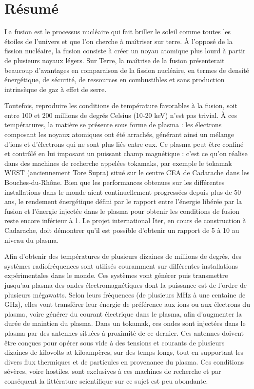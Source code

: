 \chapter*{Résumé}

La fusion est le processus nucléaire qui fait briller le soleil comme toutes les étoiles de l'univers et que l'on cherche à maîtriser sur terre. À l’opposé de la fission nucléaire, la fusion consiste à créer un noyau atomique plus lourd à partir de plusieurs noyaux légers. Sur Terre, la maîtrise de la fusion présenterait beaucoup d’avantages en comparaison de la fission nucléaire, en termes de densité énergétique, de sécurité, de ressources en combustibles et sans production intrinsèque de gaz à effet de serre. 

Toutefois, reproduire les conditions de température favorables à la fusion, soit entre 100 et 200 millions de degrés Celsius (10-20 keV) n’est pas trivial. À ces températures, la matière se présente sous forme de plasma : les électrons composant les noyaux atomiques ont été arrachés, générant ainsi un mélange d’ions et d’électrons qui ne sont plus liés entre eux. Ce plasma peut être confiné et contrôlé en lui imposant un puissant champ magnétique : c’est ce qu’on réalise dans des machines de recherche appelées tokamaks, par exemple le tokamak WEST (anciennement Tore Supra) situé sur le centre CEA de Cadarache dans les Bouches-du-Rhône. Bien que les performances obtenues sur les différentes installations dans le monde aient continuellement progressées depuis plus de 50 ans, le rendement énergétique défini par le rapport entre l'énergie libérée par la fusion et l'énergie injectée dans le plasma pour obtenir les conditions de fusion reste encore inférieur à 1. Le projet international Iter, en cours de construction à Cadarache, doit démontrer qu'il est possible d'obtenir un rapport de 5 à 10 au niveau du plasma.

Afin d'obtenir des températures de plusieurs dizaines de millions de degrés, des systèmes radiofréquences sont utilisés couramment sur différentes installations expérimentales dans le monde. Ces systèmes vont générer puis transmettre jusqu'au plasma des ondes électromagnétiques dont la puissance est de l'ordre de plusieurs mégawatts. Selon leurs fréquences (de plusieurs MHz à une centaine de GHz), elles vont transférer leur énergie de préférence aux ions ou aux électrons du plasma, voire générer du courant électrique dans le plasma, afin d'augmenter la durée de maintien du plasma. Dans un tokamak, ces ondes sont injectées dans le plasma par des antennes situées à proximité de ce dernier. Ces antennes doivent être conçues pour opérer sous vide à des tensions et courants de plusieurs dizaines de kilovolts at kiloampères, sur des temps longs, tout en supportant les divers flux thermiques et de particules en provenance du plasma. Ces conditions sévères, voire hostiles, sont exclusives à ces machines de recherche et par conséquent la littérature scientifique sur ce sujet est peu abondante.

